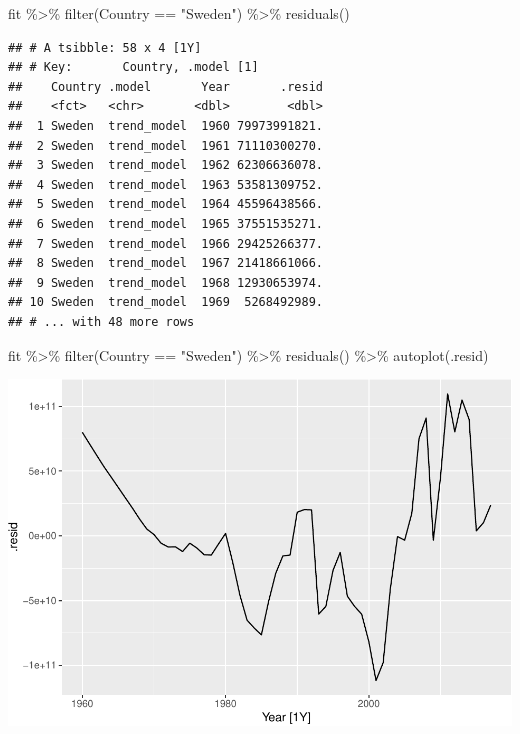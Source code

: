 \documentclass[
]{book}
\newenvironment{Shaded}{\begin{snugshade}}{\end{snugshade}}
\newcommand{\FunctionTok}[1]{\textcolor[rgb]{0.00,0.00,0.00}{#1}}
\newcommand{\NormalTok}[1]{#1}
\newcommand{\SpecialCharTok}[1]{\textcolor[rgb]{0.00,0.00,0.00}{#1}}
\newcommand{\StringTok}[1]{\textcolor[rgb]{0.31,0.60,0.02}{#1}}
\begin{document}
\begin{Shaded}
\begin{Highlighting}[]
\NormalTok{fit }\SpecialCharTok{\%\textgreater{}\%} \FunctionTok{filter}\NormalTok{(Country }\SpecialCharTok{==} \StringTok{"Sweden"}\NormalTok{) }\SpecialCharTok{\%\textgreater{}\%} \FunctionTok{residuals}\NormalTok{()}
\end{Highlighting}
\end{Shaded}

\begin{verbatim}
## # A tsibble: 58 x 4 [1Y]
## # Key:       Country, .model [1]
##    Country .model       Year       .resid
##    <fct>   <chr>       <dbl>        <dbl>
##  1 Sweden  trend_model  1960 79973991821.
##  2 Sweden  trend_model  1961 71110300270.
##  3 Sweden  trend_model  1962 62306636078.
##  4 Sweden  trend_model  1963 53581309752.
##  5 Sweden  trend_model  1964 45596438566.
##  6 Sweden  trend_model  1965 37551535271.
##  7 Sweden  trend_model  1966 29425266377.
##  8 Sweden  trend_model  1967 21418661066.
##  9 Sweden  trend_model  1968 12930653974.
## 10 Sweden  trend_model  1969  5268492989.
## # ... with 48 more rows
\end{verbatim}

\begin{Shaded}
\begin{Highlighting}[]
\NormalTok{fit }\SpecialCharTok{\%\textgreater{}\%} \FunctionTok{filter}\NormalTok{(Country }\SpecialCharTok{==} \StringTok{"Sweden"}\NormalTok{) }\SpecialCharTok{\%\textgreater{}\%} \FunctionTok{residuals}\NormalTok{() }\SpecialCharTok{\%\textgreater{}\%} \FunctionTok{autoplot}\NormalTok{(.resid)}
\end{Highlighting}
\end{Shaded}

\includegraphics{graphics/unnamed-chunk-61-1.pdf}
\end{document}
